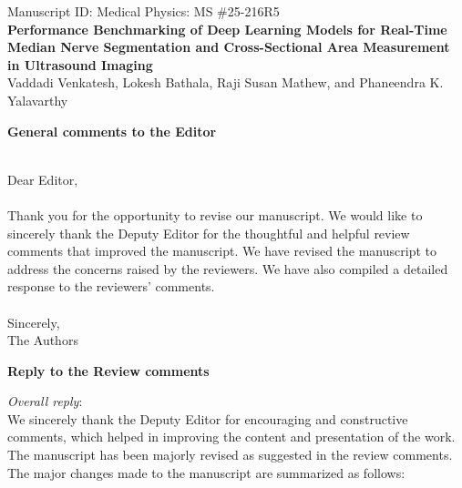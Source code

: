 \documentclass[12pt,letterpaper]{article}
\begin{document}
 
 \begin{center}

Manuscript ID: Medical Physics: MS \#25-216R5  \\
\vspace{3mm}
\textbf{Performance Benchmarking of Deep Learning Models for Real-Time Median Nerve Segmentation and Cross-Sectional Area Measurement in Ultrasound Imaging}\\ 
 \vspace{3mm}
{\large{Vaddadi Venkatesh}, \large{Lokesh Bathala}, \large{Raji Susan Mathew}, and \large{Phaneendra K. Yalavarthy}}\\
 \end{center}
 
 \hline 
 \vspace{2mm}
 \begin{center}
{\bf General comments to the Editor }
\end{center}
{\ } \\
Dear Editor, \\
{\ }\\
Thank you for the opportunity to revise our manuscript. We would like to sincerely thank the Deputy Editor for the thoughtful and helpful review comments that improved the manuscript. We have revised the manuscript to address the concerns raised by the reviewers. We have also compiled a detailed response to the reviewers’ comments.\\
{\ } \\
Sincerely, \\ 
The Authors 

\begin{center}
{{\bf Reply to the Review comments}}
\end{center}
{\it Overall reply}: \\

\noindent We sincerely thank the Deputy Editor for encouraging and constructive comments, which helped in improving the content and presentation of the work. 
The manuscript has been majorly revised as suggested in the review comments. 
The major changes made to the manuscript are summarized as follows:
\end{document}
